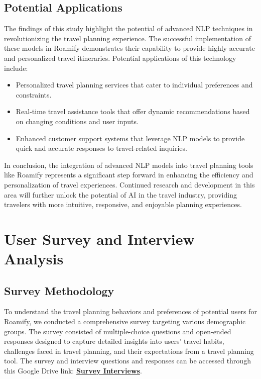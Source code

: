 \documentclass[conference]{IEEEtran}
\begin{document}
    \subsection{Potential Applications}

        The findings of this study highlight the potential of advanced NLP techniques in revolutionizing the travel planning experience. The successful implementation of these models in Roamify demonstrates their capability to provide highly accurate and personalized travel itineraries. Potential applications of this technology include:
        \begin{itemize}
            \item Personalized travel planning services that cater to individual preferences and constraints.
            \item Real-time travel assistance tools that offer dynamic recommendations based on changing conditions and user inputs.
            \item Enhanced customer support systems that leverage NLP models to provide quick and accurate responses to travel-related inquiries.
        \end{itemize}

    In conclusion, the integration of advanced NLP models into travel planning tools like Roamify represents a significant step forward in enhancing the efficiency and personalization of travel experiences. Continued research and development in this area will further unlock the potential of AI in the travel industry, providing travelers with more intuitive, responsive, and enjoyable planning experiences.


\section{User Survey and Interview Analysis}

    \subsection{Survey Methodology}
        To understand the travel planning behaviors and preferences of potential users for Roamify, we conducted a comprehensive survey targeting various demographic groups. The survey consisted of multiple-choice questions and open-ended responses designed to capture detailed insights into users' travel habits, challenges faced in travel planning, and their expectations from a travel planning tool. The survey and interview questions and responses can be accessed through this Google Drive link: \href{https://drive.google.com/drive/folders/1mKPTXZ7n7ZFmMEK6QBOKU0op3mf8hCta?usp=sharing}{\textbf{Survey Interviews}}.
\end{document}

